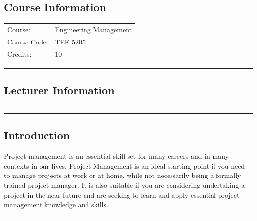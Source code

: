 
\subsection*{Course Information}
\vspace{0ex}%
\noindent\parbox{0.5\textwidth}{%
    \noindent\begin{tabular}{@{}ll}
                 \textsf{Course:}          & 	Engineering Management  \Romannum{2} \\
                 \textsf{Course Code:}         & 	TEE 5205    \\
                 \textsf{Credits:}    & 	10
    \end{tabular}}
\vspace{2ex}\hrule\vspace{2ex}

\subsection*{Lecturer Information}
\noindent\parbox{0.5\textwidth}{%
    \noindent\begin{tabular}{@{}ll}
                 
    \end{tabular}}
\vspace{2ex}\hrule\vspace{2ex}


\subsection*{Introduction}
Project management is an essential skill-set for many careers and in many contexts in our lives.
Project Management is an ideal starting point if you need to manage projects at work or at home, while not necessarily being a formally trained project manager.
It is also suitable if you are considering undertaking a project in the near future and are seeking to learn and apply essential project management knowledge and skills.
\vspace{2ex} \hrule\vspace{2ex}

